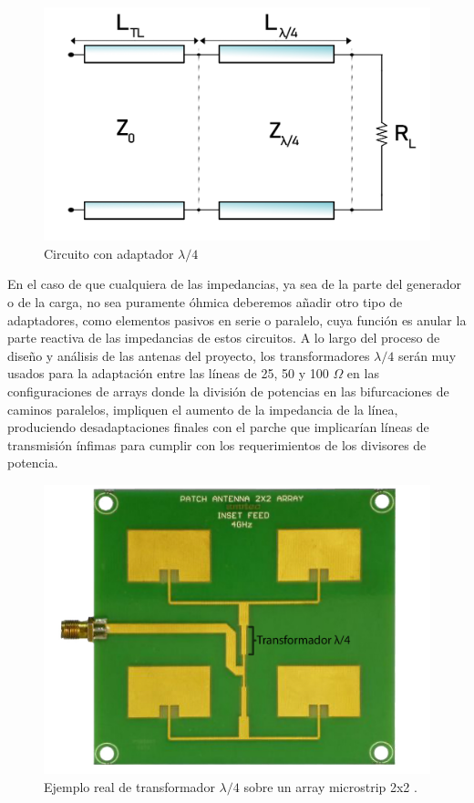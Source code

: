 \begin{figure}[h]
    \centering
        \includegraphics[width=\textwidth]{archivos/parche/lambda}
        \caption{Circuito con adaptador $\lambda/4$}
        \label{fig:lambdacuartos}
\end{figure}

\par En el caso de que cualquiera de las impedancias, ya sea de la parte del generador o de la carga, no sea puramente óhmica deberemos añadir otro tipo de adaptadores, como elementos pasivos en serie o paralelo, cuya función es anular la parte reactiva de las impedancias de estos circuitos. A lo largo del proceso de diseño y análisis de las antenas del proyecto, los transformadores $\lambda/4$ serán muy usados para la adaptación entre las líneas de 25, 50 y 100 $\Omega$ en las configuraciones de arrays donde la división de potencias en las bifurcaciones de caminos paralelos, impliquen el aumento de la impedancia de la línea, produciendo desadaptaciones finales con el parche que implicarían líneas de transmisión ínfimas para cumplir con los requerimientos de los divisores de potencia.


\begin{figure}[H]
    \centering
        \includegraphics[width=\textwidth]{archivos/transformador}
        \caption{Ejemplo real de transformador $\lambda/4$ sobre un array microstrip 2x2 . \citep{Amitec2018}}
        \label{fig:transformador}
\end{figure}










